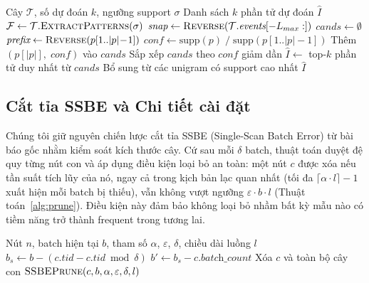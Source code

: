 \documentclass[conference]{IEEEtran}
\begin{document}
\begin{algorithm}[htbp]
\caption{Dự đoán phần tử tiếp theo (Next-Item Prediction)}
\label{alg:predict}
\begin{algorithmic}[1]
\REQUIRE Cây $\mathcal{T}$, số dự đoán $k$, ngưỡng support $\sigma$
\ENSURE Danh sách $k$ phần tử dự đoán $\hat{I}$
\STATE $\mathcal{F} \leftarrow \mathcal{T}.\textsc{ExtractPatterns}(\sigma)$
\STATE $\textit{snap} \leftarrow \textsc{Reverse}(\mathcal{T}.\textit{events}[-L_{max}:])$ 
\STATE $\textit{cands} \leftarrow \emptyset$
    \STATE $\textit{prefix} \leftarrow \textsc{Reverse}(p[1..|p|\!-\!1])$
        \STATE $\textit{conf} \leftarrow \text{supp}(p) \;/\; \text{supp}(p[1..|p|\!-\!1])$
        \STATE Thêm $(p[|p|],\; \textit{conf})$ vào $\textit{cands}$
    \ENDIF
\ENDFOR
\STATE Sắp xếp $\textit{cands}$ theo $\textit{conf}$ giảm dần
\STATE $\hat{I} \leftarrow$ top-$k$ phần tử duy nhất từ $\textit{cands}$
    \STATE Bổ sung từ các unigram có support cao nhất 
\ENDIF
\RETURN $\hat{I}$
\end{algorithmic}
\end{algorithm}

\subsection{Cắt tỉa SSBE và Chi tiết cài đặt}
Chúng tôi giữ nguyên chiến lược cắt tỉa SSBE (Single-Scan Batch Error) từ bài báo gốc \cite{hassani2019} nhằm kiểm soát kích thước cây. Cứ sau mỗi $\delta$ batch, thuật toán duyệt đệ quy từng nút con và áp dụng điều kiện loại bỏ an toàn: một nút $c$ được xóa nếu tần suất tích lũy của nó, ngay cả trong kịch bản lạc quan nhất (tối đa $\lceil \alpha \cdot l \rceil - 1$ xuất hiện mỗi batch bị thiếu), vẫn không vượt ngưỡng $\varepsilon \cdot b \cdot l$ (Thuật toán~\ref{alg:prune}). Điều kiện này đảm bảo không loại bỏ nhầm bất kỳ mẫu nào có tiềm năng trở thành frequent trong tương lai.

\begin{algorithm}[htbp]
\caption{Cắt tỉa SSBE (SSBEPrune)}
\label{alg:prune}
\begin{algorithmic}[1]
\REQUIRE Nút $n$, batch hiện tại $b$, tham số $\alpha$, $\varepsilon$, $\delta$, chiều dài luồng $l$
    \STATE $b_s \leftarrow b - (c.\textit{tid} - c.\textit{tid} \bmod \delta)$ 
    \STATE $b' \leftarrow b_s - c.\textit{batch\_count}$ 
        \STATE Xóa $c$ và toàn bộ cây con 
    \ELSE
        \STATE $\textsc{SSBEPrune}(c, b, \alpha, \varepsilon, \delta, l)$ 
    \ENDIF
\ENDFOR
\end{algorithmic}
\end{algorithm}
\end{document}
